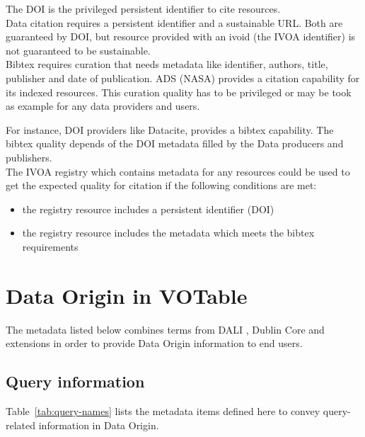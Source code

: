 \documentclass[11pt,a4paper]{ivoa}
\begin{document}
The DOI is the privileged persistent identifier to cite resources.\\

Data citation requires a persistent identifier and a sustainable URL.
Both are guaranteed by DOI, but resource provided with an ivoid (the IVOA identifier)
is not guaranteed to be sustainable.\\

Bibtex requires curation that needs metadata like identifier, authors, title, publisher and date of publication.
ADS (NASA) provides a citation capability for its indexed resources. This curation quality has to be privileged or may be took as example for any data providers and users.

For instance, DOI providers like Datacite, provides a bibtex capability. The bibtex quality depends of the DOI metadata filled by the Data producers and publishers.\\

The IVOA registry which contains metadata for any resources could be used to get the expected quality for citation if the following conditions are met:
\begin{itemize}
\item the registry resource includes a persistent identifier (DOI)
\item the registry resource includes the metadata which meets the bibtex requirements
\end{itemize}



\section{Data Origin in VOTable}
\label{sec:data-origin-in-votable}
The metadata listed below combines terms from DALI \citep{2017ivoa.spec.0517D}, Dublin Core \citep{std:DUBLINCORE} and extensions in order to provide Data Origin information to end users.

\subsection{Query information}
Table~\ref{tab:query-names} lists the metadata items defined here to
convey query-related information in Data Origin.
\end{document}
